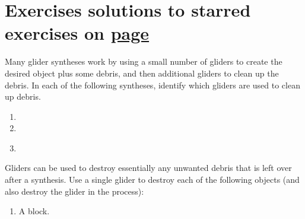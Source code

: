 \clearpage %


\section*{Exercises \hfill \normalfont\textsf{\small solutions to starred exercises on \hyperlink{solutions_glider_synthesis}{page \pageref{solutions_glider_synthesis}}}}
\label{sec:synthesis_exercises}
\vspace*{-0.4cm}\hrulefill\vspace*{-0.3cm}\footnotesize\begin{multicols}{2}\vspace*{-0.4cm}\raggedcolumns{}
	\setlength{\parskip}{0pt}\ifdefined\FORPRINTING{}\else%
\fi
	
	\begin{problem}\label{exer:glider_cleanup} 
		Many glider syntheses work by using a small number of gliders to create the desired object plus some debris, and then additional gliders to clean up the debris. In each of the following syntheses, identify which gliders are used to clean up debris.
		\begin{enumerate}[label=\bf\color{ocre}(\alph*)]
			\item {}
			\item {}
			\item {}\\
		\end{enumerate}
	\end{problem}
	
	
	\mfilbreak
	
	
	\begin{problemstar}\label{exer:single_glider_cleanup} 
		Gliders can be used to destroy essentially any unwanted debris that is left over after a synthesis. Use a single glider to destroy each of the following objects (and also destroy the glider in the process):
		\begin{enumerate}[label=\bf\color{ocre}(\alph*)]
			\item A block.
			

\end{enumerate}
\end{problemstar}
\end{multicols}
